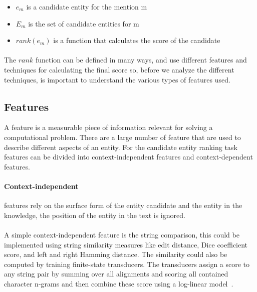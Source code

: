 \begin{itemize}[noitemsep,  topsep=10pt]
\item $e_m$ is a candidate entity for the mention m
\item $E_m$ is the set of candidate entities for m
\item $rank(e_m)$ is a function that calculates the score of the candidate
\end{itemize}

\paragraph{}
The $rank$ function can be defined in many ways, and use different features and techniques for calculating the final score so, before we analyze the different techniques, is important to understand the various types of features used.

\subsection{Features}
A feature is a measurable piece of information relevant for solving a computational problem. There are a large number of feature that are used to describe different aspects of an entity. For the candidate entity ranking task features can be divided into context-independent features and context-dependent features.

\paragraph{Context-independent} features rely on the surface form of the entity candidate and the entity in the knowledge, the position of the entity in the text is ignored. 

\paragraph{} A simple context-independent feature is the string comparison, this could be implemented using string similarity measures like edit distance, Dice coefficient score, and left and right Hamming distance. The similarity could also be computed by training finite-state transducers. The transducers assign a score to any string pair by summing over all alignments and scoring all contained character n-grams and then combine these score using a log-linear model~\cite{dredze2010entity}.

